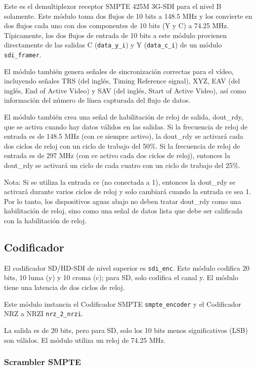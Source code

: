 Este es el demultiplexor receptor SMPTE 425M 3G-SDI para el nivel B solamente.
Este módulo toma dos flujos de 10 bits a 148.5 MHz y los convierte en dos flujos
cada uno con dos componentes de 10 bits (Y y C) a 74.25 MHz. Típicamente, los
dos flujos de entrada de 10 bits a este módulo provienen directamente de las
salidas C (\texttt{data\_y\_i}) y Y (\texttt{data\_c\_i}) de un módulo \texttt{sdi\_framer}.

El módulo también genera señales de sincronización correctas para el vídeo,
incluyendo señales TRS  (del inglés, Timing Reference signal), XYZ, EAV (del inglés, End of Active Video) y SAV (del inglés, Start of Active Video), así como información del número de
línea capturada del flujo de datos.

El módulo también crea una señal de habilitación de reloj de salida, dout\_rdy,
que se activa cuando hay datos válidos en las salidas. Si la frecuencia de reloj
de entrada es de 148.5 MHz (con ce siempre activo), la dout\_rdy se activará cada
dos ciclos de reloj con un ciclo de trabajo del 50\%. Si la frecuencia de reloj
de entrada es de 297 MHz (con ce activo cada dos ciclos de reloj), entonces la
dout\_rdy se activará un ciclo de cada cuatro con un ciclo de trabajo del 25\%.

Nota: Si se utiliza la entrada ce (no conectada a 1), entonces la dout\_rdy se
activará durante varios ciclos de reloj y solo cambiará cuando la entrada ce
sea 1. Por lo tanto, los dispositivos aguas abajo no deben tratar dout\_rdy
como una habilitación de reloj, sino como una señal de datos lista que debe
ser calificada con la habilitación de reloj.

\subsection{Codificador}

El codificador SD/HD-SDI de nivel superior es \texttt{sdi\_enc}. Este módulo codifica
20 bits, 10 luma (y) y 10 croma (c); para SD, solo codifica el canal y. El
módulo tiene una latencia de dos ciclos de reloj.

Este módulo instancia el Codificador SMPTE \texttt{smpte\_encoder} y el Codificador
NRZ a NRZI \texttt{nrz\_2\_nrzi}.

La salida es de 20 bits, pero para SD, solo los 10 bits menos significativos
(LSB) son válidos. El módulo utiliza un reloj de 74.25 MHz.

\subsubsection{Scrambler SMPTE}

